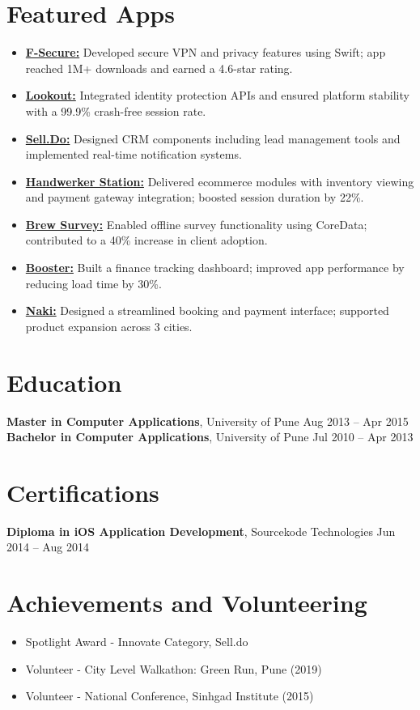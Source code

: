 \documentclass[a4paper,10pt]{article}
\begin{document}
\section*{Featured Apps}
\begin{itemize}[noitemsep,topsep=0pt]
    \item \textbf{\href{https://apps.apple.com/nl/app/f-secure-total-security-vpn/id572847748}{F-Secure:}} Developed secure VPN and privacy features using Swift; app reached 1M+ downloads and earned a 4.6-star rating.
    \item \textbf{\href{https://apps.apple.com/us/app/mobile-security-lookout/id434893913}{Lookout:}} Integrated identity protection APIs and ensured platform stability with a 99.9\% crash-free session rate.
    \item \textbf{\href{https://apps.apple.com/us/app/sell-do/id1225486345}{Sell.Do:}} Designed CRM components including lead management tools and implemented real-time notification systems.
    \item \textbf{\href{https://apps.apple.com/us/app/handwerkerstation/id1247972146}{Handwerker Station:}} Delivered ecommerce modules with inventory viewing and payment gateway integration; boosted session duration by 22\%.
    \item \textbf{\href{https://apps.apple.com/us/app/brew-survey-offline-feedback/id1207197946}{Brew Survey:}} Enabled offline survey functionality using CoreData; contributed to a 40\% increase in client adoption.
    \item \textbf{\href{https://itunes.apple.com/nz/app/booster-nz/id1179170506?mt=8}{Booster:}} Built a finance tracking dashboard; improved app performance by reducing load time by 30\%.
    \item \textbf{\href{https://itunes.apple.com/in/app/naki-laundry/id621934237?mt=8}{Naki:}} Designed a streamlined booking and payment interface; supported product expansion across 3 cities.
\end{itemize}

\section*{Education}
\textbf{Master in Computer Applications}, University of Pune \hfill Aug 2013 -- Apr 2015\\
\textbf{Bachelor in Computer Applications}, University of Pune \hfill Jul 2010 -- Apr 2013

\section*{Certifications}
\textbf{Diploma in iOS Application Development}, Sourcekode Technologies \hfill Jun 2014 -- Aug 2014

\section*{Achievements and Volunteering}
\begin{itemize}[noitemsep,topsep=0pt]
    \item Spotlight Award - Innovate Category, Sell.do
    \item Volunteer - City Level Walkathon: Green Run, Pune (2019)
    \item Volunteer - National Conference, Sinhgad Institute (2015)
\end{itemize}
\end{document}
